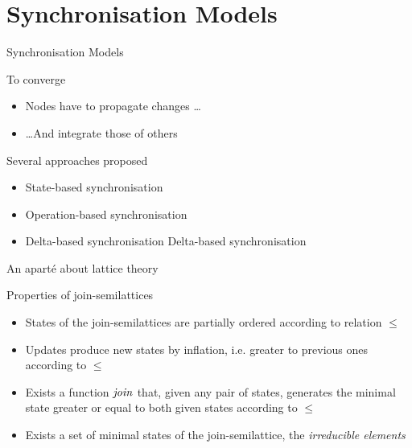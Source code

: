 \section{Synchronisation Models}

\begin{frame}{Synchronisation Models}
    \begin{block}{To converge}
        \begin{itemize}
            \item Nodes have to propagate changes \dots
            \item \dots And integrate those of others
        \end{itemize}
    \end{block}

    \begin{block}{Several approaches proposed \cite{shapiro_2011_crdt}}
        \begin{itemize}
            \item State-based synchronisation
            \item Operation-based synchronisation
            \item<2->
                 {Delta-based synchronisation \cite{Almeida_2018}}
                 {\color{gray} Delta-based synchronisation \cite{Almeida_2018}}
        \end{itemize}
    \end{block}
\end{frame}


\begin{frame}{An aparté about lattice theory}

    \begin{block}{Properties of join-semilattices}
        \begin{itemize}
            \item States of the join-semilattices are partially ordered according to relation $\leq$
            \item Updates produce new states by inflation, i.e. greater to previous ones according to $\leq$
            \item Exists a function $\mathit{join}$ that, given any pair of states, generates the minimal state greater or equal to both given states according to $\leq$
            \item Exists a set of minimal states of the join-semilattice, the \emph{irreducible elements}
        \end{itemize}
    \end{block}
\end{frame}


